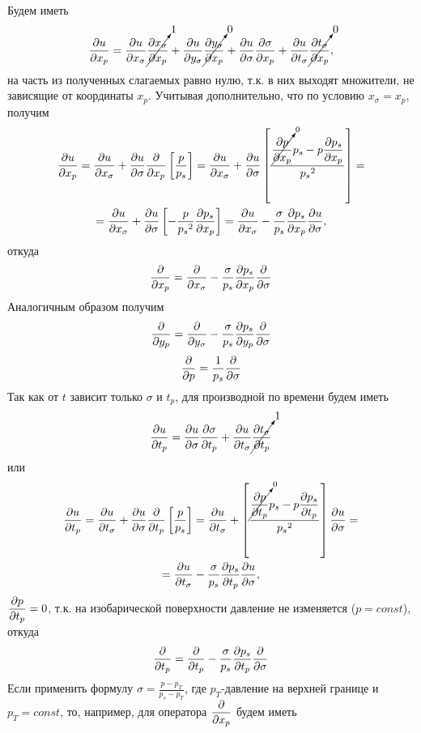 Будем иметь
\begin{equation*}
    \pd{u}{x_p}=
     \pd{u}{x_{\sigma}} \cancelto{1}{ \pd{x_{\sigma}}{x_p} }+
    \pd{u}{y_{\sigma}}\cancelto{0}{\pd{y_{\sigma}}{x_p}}+
    \pd{u}{\sigma}\pd{\sigma}{x_p}+
    \pd{u}{t_{\sigma}}\cancelto{0}{\pd{t_{\sigma}}{x_p}},  
\end{equation*}
на часть из полученных слагаемых равно нулю, т.к. в них выходят множители, не зависящие от координаты $x_p$. Учитывая дополнительно, что по условию $x_{\sigma}=x_p$, получим
\begin{multline*}
    \pd{u}{x_p}=\pd{u}{x_{\sigma}}+
        \pd{u}{\sigma}\pd{}{x_p} \left[ \frac{p}{p_s} \right] = 
        \pd{u}{x_{\sigma}}+
        \pd{u}{\sigma} \left[ \frac{ \cancelto{0}{\pd{p}{x_p}}p_s - p\pd{p_s}{x_p} } { {p_s}^2 } \right] = \\
        = \pd{u}{x_{\sigma}} + 
        \pd{u}{\sigma} \left[ -\frac{p}{{p_s}^2} \pd{p_s}{x_p} \right] = 
        \pd{u}{x_{\sigma}} - \frac{\sigma}{p_s}\pd{p_s}{x_p}\pd{u}{\sigma},
\end{multline*}
откуда
\begin{equation}
    \label{eq:sigma2px}
    \pd{}{x_p}=\pd{}{x_{\sigma}}-\frac{\sigma}{p_s}\pd{p_s}{x_p}\pd{}{\sigma}
\end{equation}
Аналогичным образом получим 
\begin{equation}
    \label{eq:sigma2py}
    \pd{}{y_p}=\pd{}{y_{\sigma}}-\frac{\sigma}{p_s}\pd{p_s}{y_p}\pd{}{\sigma}
\end{equation}
\begin{equation}
    \label{eq:sigma2pp}
    \pd{}{p}= \frac{1}{p_s}\pd{}{\sigma}
\end{equation}
Так как от $t$ зависит только $\sigma$ и $t_p$, для производной по времени будем иметь
\begin{equation*}
    \pd{u}{t_p}=
    \pd{u}{\sigma}\pd{\sigma}{t_p}+
    \pd{u}{t_{\sigma}} \cancelto{1}{\pd{t_{\sigma}}{t_p}} %
\end{equation*}
 или
 \begin{multline*}
    \pd{u}{t_p}=\pd{u}{t_{\sigma}}+
        \pd{u}{\sigma}\pd{}{t_p} \left[ \frac{p}{p_s} \right] = 
        \pd{u}{t_{\sigma}} + 
        \left[ \frac{ \cancelto{0}{\pd{p}{t_p}}p_s - 
        p\pd{p_s}{t_p} } { {p_s}^2 } \right] \pd{u}{\sigma} = \\
        = \pd{u}{t_{\sigma}} - 
        \frac{\sigma}{p_s}\pd{p_s}{t_p}\pd{u}{\sigma},
\end{multline*}
$\pd{p}{t_p}=0$, т.к. на изобарической поверхности давление не изменяется ($p=const$), откуда
\begin{equation}
    \label{eq:sigma2pt}
    \pd{}{t_p}= \pd{}{t_p} - \frac{\sigma}{p_s} \pd{p_s}{t_p} \pd{}{\sigma}
\end{equation}
Если применить формулу $\sigma=\frac{p-p_T}{p_s-p_T}$, где $p_T$-давление на верхней границе и $p_T=const$, то, например, для оператора $\pd{}{x_p}$ будем иметь


